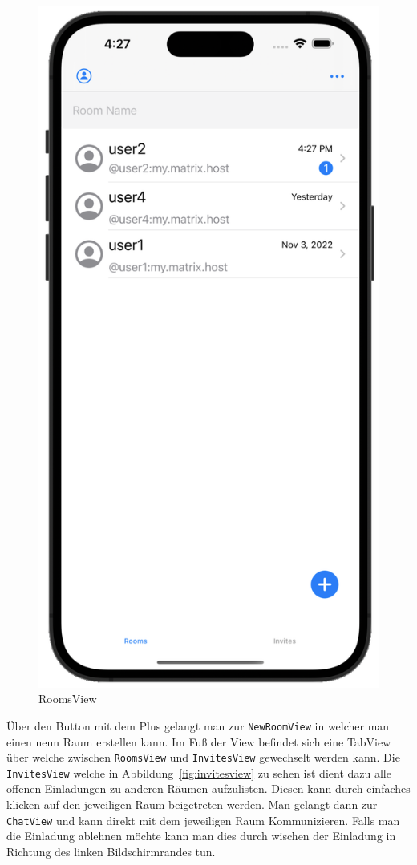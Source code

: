     \begin{figure}[h]
        \includegraphics[scale=0.5]{rooms_white}
        \centering
        \caption{RoomsView}\label{fig:roomsview}
    \end{figure}
    Über den Button mit dem Plus gelangt man zur \texttt{NewRoomView} in welcher man einen neun Raum erstellen kann.
    Im Fuß der View befindet sich eine TabView über welche zwischen \texttt{RoomsView} und \texttt{InvitesView} gewechselt werden kann.
    Die \texttt{InvitesView} welche in Abbildung~\ref{fig:invitesview} zu sehen ist dient dazu alle offenen Einladungen zu anderen Räumen aufzulisten.
    Diesen kann durch einfaches klicken auf den jeweiligen Raum beigetreten werden.
    Man gelangt dann zur \texttt{ChatView} und kann direkt mit dem jeweiligen Raum Kommunizieren.
    Falls man die Einladung ablehnen möchte kann man dies durch wischen der Einladung in Richtung des linken Bildschirmrandes tun.

